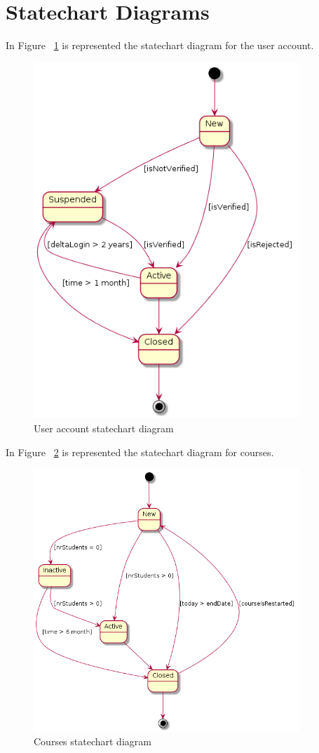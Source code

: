 \documentclass[12pt,a4paper,titlepage]{article}
\begin{document}
\section{Statechart Diagrams}
In Figure ~\ref{fig:userAccount} is represented the statechart diagram for the user account.
\begin{figure}[H]
\centering
	\includegraphics[width=10cm]{userAccount}
	\caption{User account statechart diagram}
	\label{fig:userAccount}
\end{figure}

In Figure ~\ref{fig:courses} is represented the statechart diagram for courses.
\begin{figure}[H]
\centering
	\includegraphics[width=10cm]{courses}
	\caption{Courses statechart diagram}
	\label{fig:courses}
\end{figure}
\end{document}
